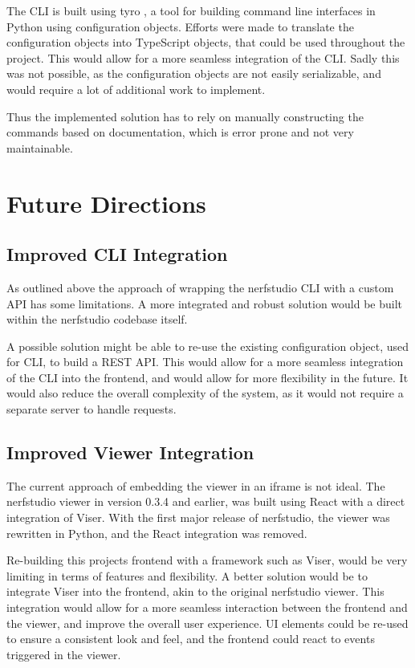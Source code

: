 The CLI is built using tyro \cite{yi_brentyityro_2024}, a tool for building command line interfaces in Python using configuration objects.
Efforts were made to translate the configuration objects into TypeScript objects, that could be used throughout the project.
This would allow for a more seamless integration of the CLI.
Sadly this was not possible, as the configuration objects are not easily serializable, and would require a lot of additional work to implement.

Thus the implemented solution has to rely on manually constructing the commands based on documentation, which is error prone and not very maintainable.

\section{Future Directions}
\label{sec:system:future}

\subsection{Improved CLI Integration}

As outlined above the approach of wrapping the nerfstudio CLI with a custom API has some limitations.
A more integrated and robust solution would be built within the nerfstudio codebase itself.

A possible solution might be able to re-use the existing configuration object, used for CLI, to build a REST API.
This would allow for a more seamless integration of the CLI into the frontend, and would allow for more flexibility in the future.
It would also reduce the overall complexity of the system, as it would not require a separate server to handle requests.

\subsection{Improved Viewer Integration}

The current approach of embedding the viewer in an iframe is not ideal.
The nerfstudio viewer in version 0.3.4 and earlier, was built using React with a direct integration of Viser.
With the first major release of nerfstudio, the viewer was rewritten in Python, and the React integration was removed.

Re-building this projects frontend with a framework such as Viser, would be very limiting in terms of features and flexibility.
A better solution would be to integrate Viser into the frontend, akin to the original nerfstudio viewer.
This integration would allow for a more seamless interaction between the frontend and the viewer, and improve the overall user experience.
UI elements could be re-used to ensure a consistent look and feel, and the frontend could react to events triggered in the viewer.

